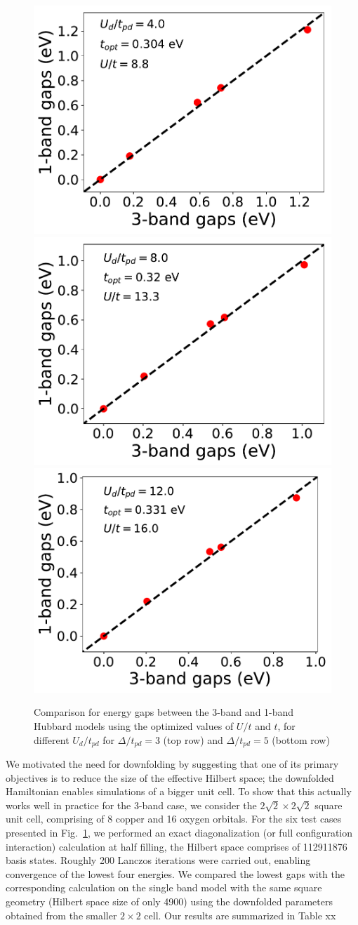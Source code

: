 \begin{figure}[]
\centering
\includegraphics[width=0.325\linewidth]{./Figures/Gap_1_band_3_band_ep_3_number_5.pdf}
\includegraphics[width=0.325\linewidth]{./Figures/Gap_1_band_3_band_ep_3_number_9.pdf}
\includegraphics[width=0.325\linewidth]{./Figures/Gap_1_band_3_band_ep_3_number_2.pdf}
\caption{Comparison for energy gaps between the 3-band and 1-band Hubbard models 
using the optimized values of $U/t$ and $t$, for different $U_{d}/t_{pd}$ for $\Delta/t_{pd}=3$ (top row) 
and $\Delta/t_{pd}=5$ (bottom row)}
\label{fig:energyfit} 
\end{figure}	

We motivated the need for downfolding by suggesting that one of its primary objectives 
is to reduce the size of the effective Hilbert space; the downfolded Hamiltonian enables 
simulations of a bigger unit cell. To show that this actually works well in practice for the 3-band case, 
we consider the $2\sqrt{2} \times 2 \sqrt{2}$ square unit cell, comprising of 8 copper and 16 oxygen orbitals. 
For the six test cases presented in Fig.~\ref{fig:energyfit}, we performed an exact diagonalization 
(or full configuration interaction) calculation at half filling, the Hilbert space comprises of 112911876 basis states. 
Roughly 200 Lanczos iterations were carried out, enabling convergence of the lowest four energies. 
We compared the lowest gaps with the corresponding calculation on the single 
band model with the same square geometry (Hilbert space size of only 4900) using the downfolded 
parameters obtained from the smaller $2 \times 2$ cell. Our results are summarized in Table xx

